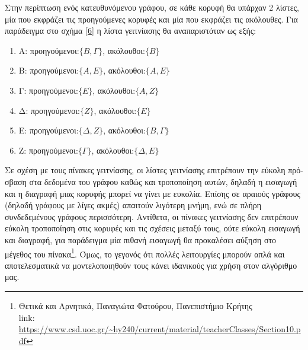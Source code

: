Στην περίπτωση ενός κατευθυνόμενου γράφου, σε κάθε κορυφή θα υπάρχαν 2 λίστες, μία που εκφράζει τις προηγούμενες κορυφές και μία που εκφράζει τις ακόλουθες. Για παράδειγμα στο σχήμα \ref{6} η λίστα γειτνίασης θα αναπαριστόταν ως εξής: 
\begin{enumerate}
    \item Α: προηγούμενοι:$\{B, Γ\}$, ακόλουθοι:$\{B\}$
    \item Β: προηγούμενοι:$\{A, E\}$, ακόλουθοι:$\{A, E\}$
    \item Γ: προηγούμενοι:$\{E\}$, ακόλουθοι:$\{A, Z\}$
    \item Δ: προηγούμενοι:$\{Z\}$, ακόλουθοι:$\{E\}$
    \item Ε: προηγούμενοι:$\{Δ, Z\}$, ακόλουθοι:$\{B, Γ\}$
    \item Ζ: προηγούμενοι:$\{Γ\}$, ακόλουθοι:$\{Δ, E\}$
    
\end{enumerate}


Σε σχέση με τους πίνακες γειτνίασης, οι λίστες γειτνίασης επιτρέπουν την εύκολη πρό- σβαση στα δεδομένα του γράφου καθώς και τροποποίηση αυτών, δηλαδή η εισαγωγή και η διαγραφή μιας κορυφής μπορεί να γίνει με ευκολία. Επίσης σε αραιούς γράφους (δηλαδή γράφους με λίγες ακμές) απαιτούν λιγότερη μνήμη, ενώ σε πλήρη συνδεδεμένους γράφους περισσότερη. Αντίθετα, οι πίνακες γειτνίασης δεν επιτρέπουν εύκολη τροποποίηση στις κορυφές και τις σχέσεις μεταξύ τους, ούτε εύκολη εισαγωγή και διαγραφή, για παράδειγμα μία πιθανή εισαγωγή θα προκαλέσει αύξηση στο μέγεθος του πίνακα\footnote{Θετικά και Αρνητικά, Παναγιώτα Φατούρου, Πανεπιστήμιο Κρήτης \\link: \url{https://www.csd.uoc.gr/~hy240/current/material/teacherClasses/Section10.pdf}}. Όμως, το γεγονός ότι πολλές λειτουργίες μπορούν απλά και αποτελεσματικά να μοντελοποιηθούν τους κάνει ιδανικούς για χρήση στον αλγόριθμο μας. 
